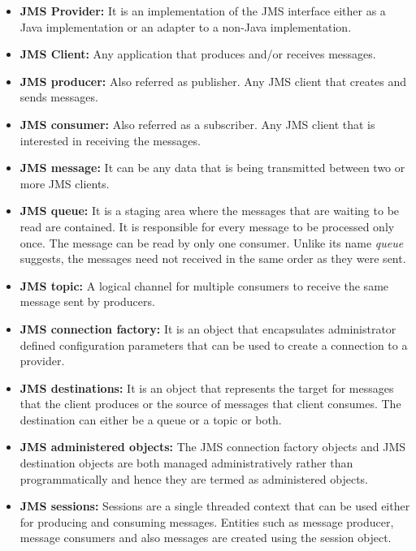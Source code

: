 \begin{itemize}
    \item \textbf{JMS Provider:}
          It is an implementation of the JMS interface either as a Java implementation or an adapter to a non-Java implementation. 

    \item \textbf{JMS Client:}
        Any application that produces and/or receives messages.

    \item \textbf{JMS producer:}
        Also referred as publisher. Any JMS client that creates and sends messages. 

    \item \textbf{JMS consumer:}
        Also referred as a subscriber. Any JMS client that is interested in receiving the messages.

    \item \textbf{JMS message:}
        It can be any data that is being transmitted between two or more JMS clients.

    \item \textbf{JMS queue:}
        It is a staging area where the messages that are waiting to be read are contained. It is responsible for every message to be processed only once. The message can be read by only one consumer. Unlike its name \textit{queue} suggests, the messages need not received in the same order as they were sent. 

    \item \textbf{JMS topic:}
        A logical channel for multiple consumers to receive the same message sent by producers.

    \item \textbf{JMS connection factory:}
        It is an object that encapsulates administrator defined configuration parameters that can be used to create a connection to a provider.

    \item \textbf{JMS destinations:}
        It is an object that represents the target for messages that the client produces or the source of messages that client consumes. The destination can either be a queue or a topic or both.

    \item \textbf{JMS administered objects:}
        The JMS connection factory objects and JMS destination objects are both managed administratively rather than programmatically and hence they are termed as administered objects.

    \item \textbf{JMS sessions:}
        Sessions are a single threaded context that can be used either for producing and consuming messages.
        Entities such as message producer, message consumers and also messages are created using the session object.

\end{itemize}

